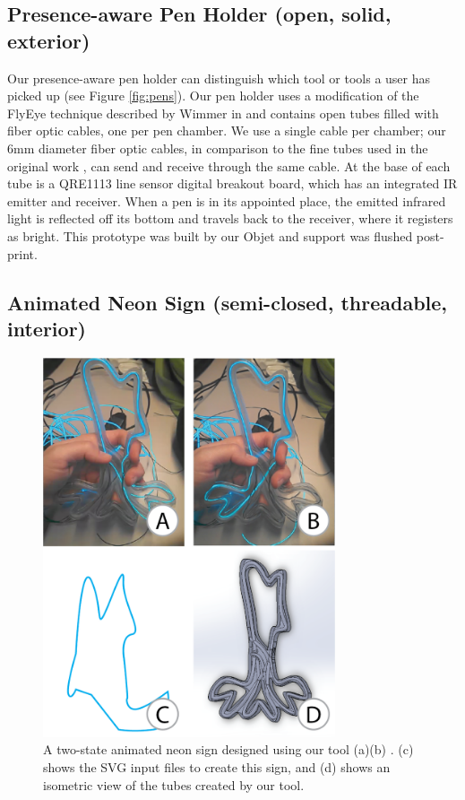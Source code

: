 \subsection{Presence-aware Pen Holder (open, solid, exterior)}

Our presence-aware pen holder can distinguish which tool or tools a user has picked up (see Figure \ref{fig:pens}).  Our pen holder uses a modification of the FlyEye technique described by Wimmer in \cite{Wimmer-flyeye} and contains open tubes filled with fiber optic cables, one per pen chamber.  We use a single cable per chamber; our 6mm diameter fiber optic cables, in comparison to the fine tubes used in the original work , can send and receive through the same cable.  At the base of each tube is a QRE1113 line sensor digital breakout board, which has an integrated IR emitter and receiver.   When a pen is in its appointed place, the emitted infrared light is reflected off its bottom and travels back to the receiver, where it registers as bright.  This prototype was built by our Objet and support was flushed post-print. 

\subsection{Animated Neon Sign (semi-closed, threadable, interior)}

\begin{figure}[h!]
\centering
    \includegraphics[width=3.4in]{figures/sign.png}
\caption{A two-state animated neon sign designed using our tool (a)(b) .  (c) shows the SVG input files to create this sign, and (d) shows an isometric view of the tubes created by our tool. }
\label{fig:neon}
\end{figure}

